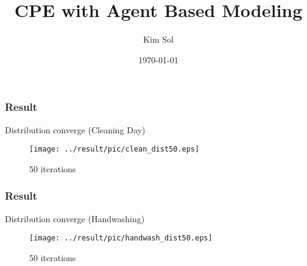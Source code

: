 \documentclass[aspectratio=169, 9pt, xcolor=table]{beamer}
\title{CPE with Agent Based Modeling}
\author{Kim Sol}
\institute{School of Mathematics and Computing}
\date{\today}
\begin{document}
\begin{frame}
    \titlepage
\end{frame}




    

\begin{frame}
    \frametitle{Result}
    Distribution converge (Cleaning Day)
    \begin{figure}[H]
        \centering
        \texttt{[image: ../result/pic/clean\_dist50.eps]} %
        \caption{50 iterations}
    \end{figure}
\end{frame}

\begin{frame}
    \frametitle{Result}
    Distribution converge (Handwashing)
    \begin{figure}[H]
        \centering
        \texttt{[image: ../result/pic/handwash\_dist50.eps]} %
        \caption{50 iterations}
    \end{figure}
\end{frame}
\end{document}
